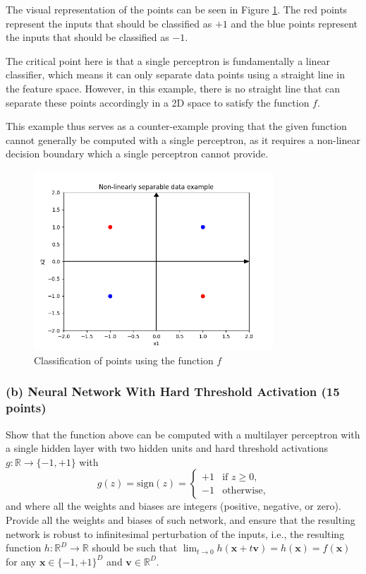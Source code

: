 \documentclass{article}
\begin{document}
The visual representation of the points can be seen in Figure \ref{fig:points}. The red points represent the inputs that should be classified as \( +1 \) and the blue points represent the inputs that should be classified as \( -1 \).

The critical point here is that a single perceptron is fundamentally a linear classifier, which means it can only separate data points using a straight line in the feature space. However, in this example, there is no straight line that can separate these points accordingly in a 2D space to satisfy the function \( f \).

This example thus serves as a counter-example proving that the given function cannot generally be computed with a single perceptron, as it requires a non-linear decision boundary which a single perceptron cannot provide.

\begin{figure}[H]
    \centering
    \includegraphics[width=0.8\textwidth]{"3a.png"}
    \caption{Classification of points using the function \( f \)}
    \label{fig:points}
\end{figure}

\subsubsection*{(b) Neural Network With Hard Threshold Activation (15 points)}

Show that the function above can be computed with a multilayer perceptron with a single hidden layer with two hidden units and hard threshold activations \( g: \mathbb{R} \rightarrow \{-1,+1\} \) with
\[
    g(z) = \text{sign}(z) =
    \begin{cases}
        +1 & \text{if } z \geq 0, \\
        -1 & \text{otherwise},
    \end{cases}
\]
and where all the weights and biases are integers (positive, negative, or zero).
Provide all the weights and biases of such network, and ensure that the resulting network is robust to infinitesimal perturbation of the inputs, i.e., the resulting function \( h: \mathbb{R}^D \rightarrow \mathbb{R} \) should be such that
\( \lim_{t \rightarrow 0} h(\bm{x} + t\bm{v}) = h(\bm{x}) = f(\bm{x}) \) for any \( \bm{x} \in \{-1,+1\}^D \) and \( \bm{v} \in \mathbb{R}^D \).
\end{document}
